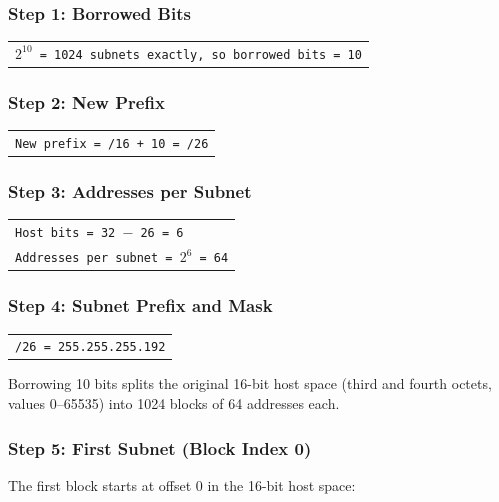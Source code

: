 \documentclass[11pt,a4paper]{article}
\begin{document}
\subsubsection*{Step 1: Borrowed Bits}

\begin{tabularx}{\textwidth}{@{}X@{}}
\texttt{$2^{10}$ = 1024 subnets exactly, so borrowed bits = 10} \\
\end{tabularx}

\subsubsection*{Step 2: New Prefix}

\begin{tabularx}{\textwidth}{@{}X@{}}
\texttt{New prefix = /16 + 10 = /26} \\
\end{tabularx}

\subsubsection*{Step 3: Addresses per Subnet}

\begin{tabularx}{\textwidth}{@{}X@{}}
\texttt{Host bits = 32 $-$ 26 = 6} \\
\texttt{Addresses per subnet = $2^{6}$ = 64} \\
\end{tabularx}

\subsubsection*{Step 4: Subnet Prefix and Mask}

\begin{tabularx}{\textwidth}{@{}X@{}}
\texttt{/26 = 255.255.255.192} \\
\end{tabularx}

Borrowing 10 bits splits the original 16-bit host space (third and fourth
octets, values 0--65535) into 1024 blocks of 64 addresses each.

\subsubsection*{Step 5: First Subnet (Block Index 0)}

The first block starts at offset 0 in the 16-bit host space:
\end{document}
